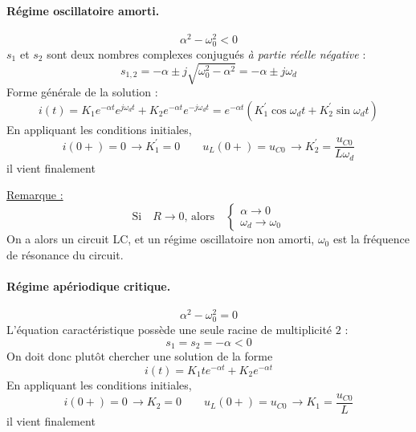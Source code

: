 \paragraph{Régime oscillatoire amorti.} 
$$\alpha^2 - \omega_0^2 < 0 $$
	$s_1$ et $s_2$ sont deux nombres complexes conjugués {\em à partie réelle négative}  :
	{\[s_{1,2}=-\alpha \pm j\sqrt{\omega_0^2-\alpha^2}= -\alpha \pm j\omega_d \]}
	Forme générale de la solution :
	{\[i(t)=K_1 e^{-\alpha t}e^{j\omega_d t} + K_2 e^{-\alpha t}e^{-j\omega_d t}
		= e^{-\alpha t}(K_1^{'}\cos \omega_d t + K_2^{'}\sin \omega_d t) \]}
	En appliquant les conditions initiales, 
	\[i(0+)=0 \, \rightarrow K_1^{'}=0 \qquad u_L(0+)=u_{C0}\, \rightarrow K_2^{'}=\frac{u_{C0}}{L\omega_d}\]
	il vient finalement 
	\begin{center}
	\end{center}

\noindent\underline{Remarque :}
\[\text{Si} \quad R\rightarrow 0 \text{, alors}\quad 
\left\{
\begin{array}{l}
\alpha \rightarrow 0\\
\omega_d \rightarrow \omega_0
\end{array}\right.\]
On a alors un circuit LC, et un régime oscillatoire non amorti, $\omega_0$ est la
fréquence de résonance du circuit.
	
\paragraph{Régime apériodique critique.} $$\alpha^2 - \omega_0^2 = 0 $$
L'équation caractéristique possède une seule racine de multiplicité $2$ :
	{ \[s_{1}=s_2=-\alpha < 0\]}
On doit donc plutôt chercher une solution de la forme
	{ \[i(t)=K_1 te^{-\alpha t}+K_2e^{-\alpha t}\]}
En appliquant les conditions initiales, 
	\[i(0+)=0 \, \rightarrow K_2=0 \qquad u_L(0+)=u_{C0}\, \rightarrow K_1=\frac{u_{C0}}{L}\]
il vient finalement 
	\begin{center}
	\end{center}

